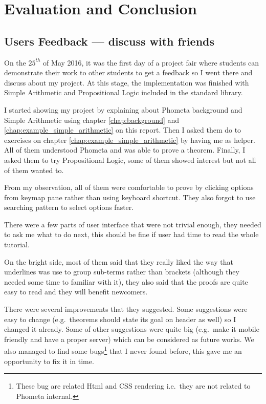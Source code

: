 \documentclass[master.tex]{subfiles}
\begin{document}
\chapter{Evaluation and Conclusion}
\label{chap:evaluation_conclusion}

\vspace{-1em}

\section{Users Feedback --- discuss with friends}

On the $25^{th}$ of May 2016, it was the first day of a project fair where
students can demonstrate their work to other students to get a feedback so I
went there and discuss about my project. At this stage, the implementation was
finished with Simple Arithmetic and Propositional Logic included in the standard
library.

I started showing my project by explaining about Phometa background and Simple
Arithmetic using chapter \ref{chap:background} and
\ref{chap:example_simple_arithmetic} on this report. Then I asked them do to
exercises on chapter \ref{chap:example_simple_arithmetic} by having me as
helper. All of them understood Phometa and was able to prove a theorem. Finally,
I asked them to try Propositional Logic, some of them showed interest but not
all of them wanted to.

From my observation, all of them were comfortable to prove by clicking options
from keymap pane rather than using keyboard shortcut. They also forgot to use
searching pattern to select options faster.

There were a few parts of user interface that were not trivial enough, they
needed to ask me what to do next, this should be fine if user had time to read
the whole tutorial.

On the bright side, most of them said that they really liked the way that
underlines was use to group sub-terms rather than brackets (although they needed
some time to familiar with it), they also said that the proofs are quite easy to
read and they will benefit newcomers.

There were several improvements that they suggested. Some suggestions
were easy to change (e.g.\ theorems should state its goal on header as well) so
I changed it already. Some of other suggestions were quite big (e.g.\ make it
mobile friendly and have a proper server) which can be considered as future
works. We also managed to find some bugs\footnote{These bug are
  related Html and CSS rendering i.e.\ they are not related to Phometa internal.} that I never found before,
this gave me an opportunity to fix it in time.
\end{document}

